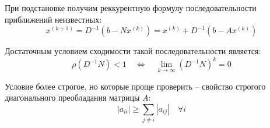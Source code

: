 \documentclass[report.tex]{subfiles}
\begin{document}
    При подстановке получим реккурентную формулу последовательности приближений неизвестных:
    \[x^{(k+1)} = D^{-1}(b - N x^{(k)}) = x^{(k)} + D^{-1}(b - A x^{(k)})\]

    Достаточным условием сходимости такой последовательности является:
    \[\rho(D^{-1}N) < 1 \quad \Leftrightarrow \quad \lim_{k \rightarrow \infty} (D^{-1}N)^k = 0\]

    Условие более строгое, но которые проще проверить -- свойство строгого диагонального преобладания матрицы $A$:
    \[|a_{ii}| \geq \sum _{j\neq i}|a_{ij}| \quad \forall i\]
\end{document}
